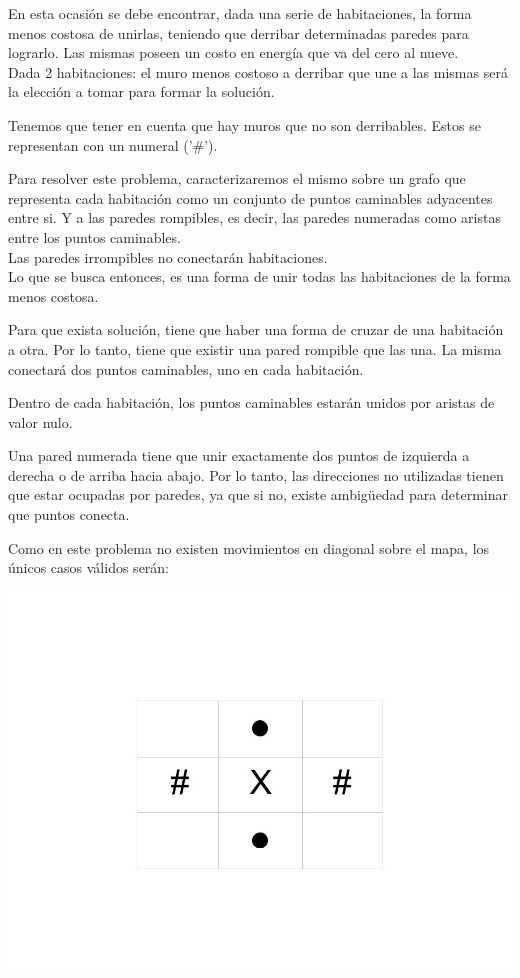 En esta ocasión se debe encontrar, dada una serie de habitaciones, la forma menos costosa de unirlas, teniendo que derribar determinadas paredes para lograrlo. Las mismas poseen un costo en energía que va del cero al nueve.\\

Dada 2 habitaciones: el muro menos costoso a derribar que une a las mismas será la elección a tomar para formar la solución.

Tenemos que tener en cuenta que hay muros que no son derribables. Estos se representan con un numeral ('\#').

Para resolver este problema, caracterizaremos el mismo sobre un grafo que representa cada habitación como un conjunto de puntos caminables adyacentes entre si. Y a las paredes rompibles, es decir, las paredes numeradas como aristas entre los puntos caminables.\\
Las paredes irrompibles no conectarán habitaciones.\\

Lo que se busca entonces, es una forma de unir todas las habitaciones de la forma menos costosa. 

Para que exista solución, tiene que haber una forma de cruzar de una habitación a otra. Por lo tanto, tiene que existir una pared rompible que las una. La misma conectará dos puntos caminables, uno en cada habitación. 

Dentro de cada habitación, los  puntos caminables estarán unidos por aristas de valor nulo.

Una pared numerada tiene que unir exactamente dos puntos de izquierda a derecha o de arriba hacia abajo. Por lo tanto, las direcciones no utilizadas tienen que estar ocupadas por paredes, ya que si no, existe ambig{\"u}edad para determinar que puntos conecta.

Como en este problema no existen movimientos en diagonal sobre el mapa, los únicos casos válidos serán:

\vspace*{0.3cm} \vspace*{0.3cm}
  \begin{center}
\includegraphics[scale=0.2]{./EJ2/casosValidos.jpg}
{}
  \end{center}
  \vspace*{0.3cm}

